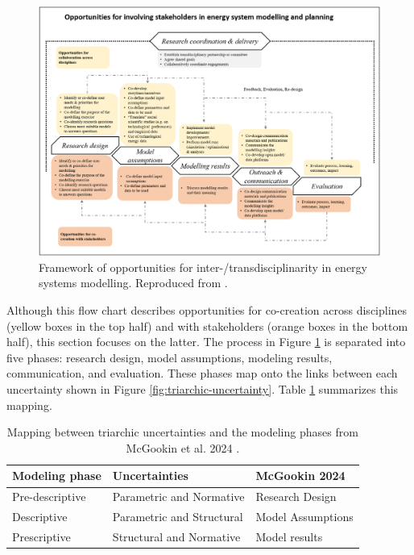 \begin{figure}[ht!]
    \centering
    \includegraphics[width=\columnwidth]{figures/06_modeling_theory_chapter/participatory-modeling-flow-chart.jpg}
    \caption{Framework of opportunities for inter-/transdisciplinarity in energy
    systems modelling. Reproduced from \cite{mcgookin_advancing_2024}.}
    \label{fig:participatory-flow}
\end{figure}

Although this flow chart describes opportunities for co-creation across
disciplines (yellow boxes in the top half) and with stakeholders (orange boxes
in the bottom half), this section focuses on the latter. The process in Figure
\ref{fig:participatory-flow} is separated into five phases: research design,
model assumptions, modeling results, communication, and evaluation. These phases
map onto the links between each uncertainty shown in Figure
\ref{fig:triarchic-uncertainty}. Table \ref{tab:modeling-phases} summarizes this
mapping.

\begin{table}[ht!]
    \centering
    \caption{Mapping between triarchic uncertainties and the modeling phases
    from McGookin et al. 2024 \cite{mcgookin_advancing_2024}.}
    \label{tab:modeling-phases}
    \begin{tabular}{lll}
        \toprule
        Modeling phase & Uncertainties & McGookin 2024
        \cite{mcgookin_advancing_2024}\\
        \midrule
        Pre-descriptive&Parametric and Normative&Research Design\\
        Descriptive&Parametric and Structural&Model Assumptions\\
        Prescriptive&Structural and Normative&Model results\\
        \bottomrule
    \end{tabular}
\end{table}

